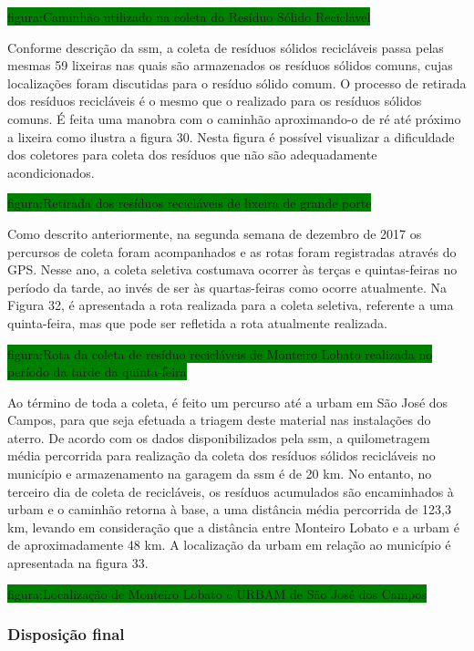 	\colorbox{green}{figura:Caminhão utilizado na coleta do Resíduo Sólido Reciclável}	
		
	Conforme descrição da \gls{ssm}, a coleta de resíduos sólidos recicláveis passa pelas mesmas 59 lixeiras nas quais são armazenados os resíduos sólidos comuns, cujas localizações foram discutidas para o resíduo sólido comum.
	O processo de retirada dos resíduos recicláveis é o mesmo que o realizado para os resíduos sólidos comuns. É feita uma manobra com o caminhão aproximando-o de ré até próximo a lixeira como ilustra a figura 30. Nesta figura é possível visualizar a dificuldade dos coletores para coleta dos resíduos que não são adequadamente acondicionados.
	
	\colorbox{green}{figura:Retirada dos resíduos recicláveis de lixeira de grande porte}
	
	Como descrito anteriormente, na segunda semana de dezembro de 2017 os percursos de coleta foram acompanhados e as rotas foram registradas através do GPS. Nesse ano, a coleta seletiva costumava ocorrer às terças e quintas-feiras no período da tarde, ao invés de ser às quartas-feiras como ocorre atualmente. Na Figura 32, é apresentada a rota realizada para a coleta seletiva, referente a uma quinta-feira, mas que pode ser refletida a rota atualmente realizada.
	
	\colorbox{green}{figura:Rota da coleta de resíduo recicláveis de Monteiro Lobato realizada no período da tarde da quinta-feira}
	
	Ao término de toda a coleta, é feito um percurso até a \gls{urbam} em São José dos Campos, para que seja efetuada a triagem deste material nas instalações do aterro. De acordo com os dados disponibilizados pela \gls{ssm}, a quilometragem média percorrida para realização da coleta dos resíduos sólidos recicláveis no município e armazenamento na garagem da \gls{ssm} é de 20 km. No entanto, no terceiro dia de coleta de recicláveis, os resíduos acumulados são encaminhados à \gls{urbam} e o caminhão retorna à base, a uma distância média percorrida de 123,3 km, levando em consideração que a distância entre Monteiro Lobato e a \gls{urbam} é de aproximadamente 48 km. A localização da \gls{urbam} em relação ao município é apresentada na figura 33.
	
	\colorbox{green}{figura:Localização de Monteiro Lobato e URBAM de São José dos Campos}
	
	\subsubsection{Disposição final}
	
